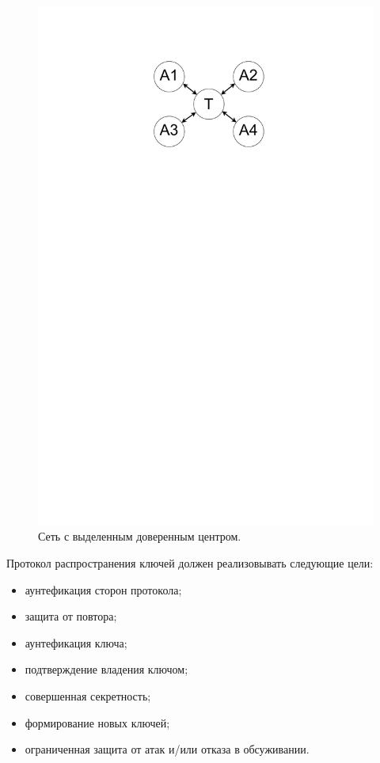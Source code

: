 \documentclass[a4paper]{article}
\begin{document}
\begin{figure}[H]
\begin{center}
\begin{minipage}[h]{0.43\linewidth}
	\includegraphics[width=1\linewidth]{pic2.pdf}
	\caption{Сеть с выделенным доверенным центром.}
	\label{p3}
	\end{minipage}
	\end{center}
\end{figure}

Протокол распространения ключей должен реализовывать следующие цели:
\begin{itemize}
    \item аунтефикация сторон протокола;
    \item защита от повтора;
    \item аунтефикация ключа;
    \item подтверждение владения ключом;
    \item совершенная секретность;
    \item формирование новых ключей;
    \item ограниченная защита от атак и/или отказа в обсуживании.
\end{itemize}
\end{document}
